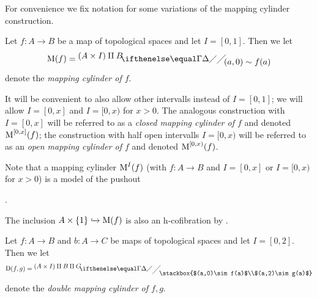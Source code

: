 For convenience we fix notation for some variations of the mapping cylinder construction.
\begin{definition}
    Let $f\colon A\to B$ be a map of topological spaces and let $I=[0,1]$.
    Then we let
    \begin{equation*}
        \M(f)=\newfaktor{\left(A\times I\right)\amalg B}{(a,0)\sim f(a)}
    \end{equation*}
    denote the \emph{mapping cylinder of $f$}.

    It will be convenient to also allow other intervalls instead of $I=[0,1]$; we will allow $I=[0,x]$ and $I=[0,x)$ for $x>0$.
    The analogous construction with $I=[0,x]$ will be referred to as a \emph{closed mapping cylinder of $f$} and denoted $\operatorname{M}^{[0,x]}(f)$;
    the construction with half open intervalls $I=[0,x)$ will be referred to as an \emph{open mapping cylinder of $f$} and denoted $\operatorname{M}^{[0,x)}(f)$.
\end{definition}
\begin{remark}\label{rmk:inclIntoMappingCylIsHCofib}
    Note that a mapping cylinder $\operatorname{M}^I(f)$ (with $f\colon A\to B$ and $I=[0,x]$ or $I=[0,x)$ for $x>0$) is a model of the pushout 
    \begin{center}
        \;.
    \end{center}
    The inclusion $A\times\left\lbrace1\right\rbrace\xhookrightarrow{}\operatorname{M}(f)$ is also an h-cofibration by \cite[Theorem 2]{note_on_cofibs_1}.
\end{remark}
\begin{definition}\label{def:doubleMappingCylinder}
    Let $f\colon A\to B$ and $b\colon A\to C$ be maps of topological spaces and let $I=[0,2]$.
    Then we let
    \begin{equation*} %
        \D(f,g)=\newfaktor{\left(A\times I\right)\amalg B\amalg C}{\stackbox{$(a,0)\sim f(a)$\\$(a,2)\sim g(a)$}}[-1]
    \end{equation*}
    denote the \emph{double mapping cylinder of $f,g$}.
\end{definition}
